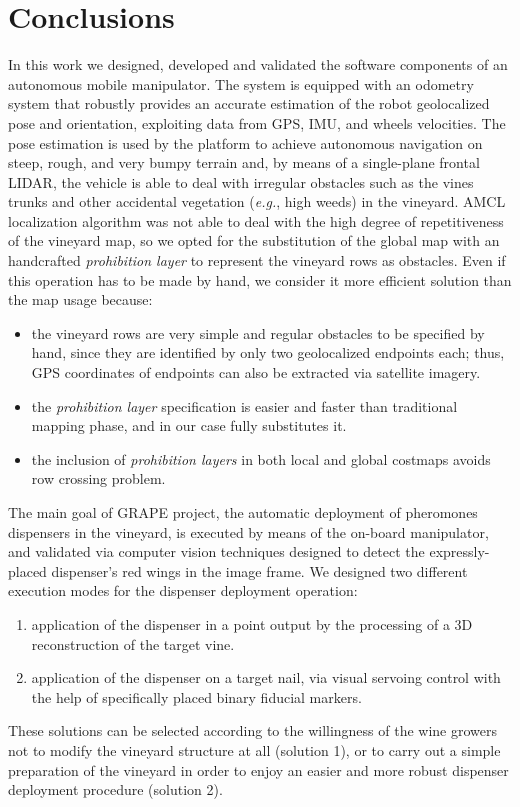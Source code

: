 
\chapter{Conclusions} \label{chap:conclusions}

In this work we designed, developed and validated the software components of an autonomous mobile manipulator. The system is equipped with an odometry system that robustly provides an accurate estimation of the robot geolocalized pose and orientation, exploiting data from GPS, IMU, and wheels velocities. The pose estimation is used by the platform to achieve autonomous navigation on steep, rough, and very bumpy terrain and, by means of a single-plane frontal \ac{LIDAR}, the vehicle is able to deal with irregular obstacles such as the vines trunks and other accidental vegetation (\textit{e.g.}, high weeds) in the vineyard.
\ac{AMCL} localization algorithm was not able to deal with the high degree of repetitiveness of the vineyard map, so we opted for the substitution of the global map with an handcrafted  \textit{prohibition layer} to represent the vineyard rows as obstacles. Even if this operation has to be made by hand, we consider it more efficient solution than the map usage because:
\begin{itemize}
	\item the vineyard rows are very simple and regular obstacles to be specified by hand, since they are identified by only two geolocalized endpoints each; thus, GPS coordinates of endpoints can also be extracted via satellite imagery.
	\item the \textit{prohibition layer} specification is easier and faster than traditional mapping phase, and in our case fully substitutes it.
	\item the inclusion of \textit{prohibition layers} in both local and global costmaps avoids row crossing problem.
\end{itemize}
The main goal of \ac{GRAPE} project, the automatic deployment of pheromones dispensers in the vineyard, is executed by means of the on-board manipulator, and validated via computer vision techniques designed to detect the expressly-placed dispenser's red wings in the image frame.
We designed two different execution modes for the dispenser deployment operation:
\begin{enumerate}
	\item application of the dispenser in a point output by the processing of a 3D reconstruction of the target vine.
	\item application of the dispenser on a target nail, via visual servoing control with the help of specifically placed binary fiducial markers.
\end{enumerate}
These solutions can be selected according to the willingness of the wine growers not to modify the vineyard structure at all (solution 1), or to carry out a simple preparation of the vineyard in order to enjoy an easier and more robust dispenser deployment procedure (solution 2).

